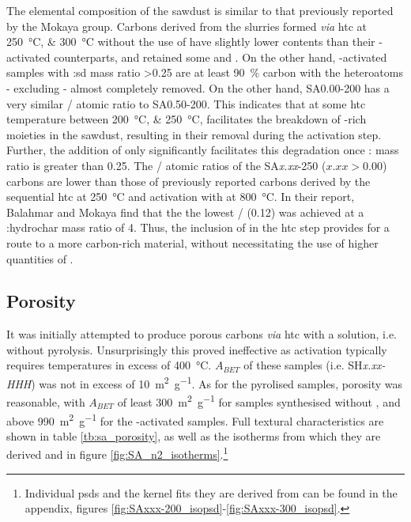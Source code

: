The elemental composition of the sawdust is similar to that previously reported by the Mokaya group.\citep{Balahmar2019Pre, Balahmar2017Biomass} Carbons derived from the slurries formed \textit{via} \gls{htc} at \qtylist[list-units=single, list-final-separator={or }]{250;300}{\degreeCelsius} without the use of  have slightly lower  contents than their -activated counterparts, and retained some  and . On the other hand, -activated samples with :\acrshort{sd} mass ratio \num{>0.25} are at least \qty{90}{\percent} carbon with the heteroatoms - excluding  - almost completely removed. On the other hand, SA0.00-200 has a very similar / atomic ratio to SA0.50-200. This indicates that at some \gls{htc} temperature between \qtylist[list-units=single]{200;250}{\degreeCelsius},  facilitates the breakdown of -rich moieties in the sawdust, resulting in their removal during the activation step. Further, the addition of  only significantly facilitates this degradation once : mass ratio is greater than 0.25. The / atomic ratios of the SA\textit{x.xx}-250 ($x.xx>0.00$) carbons are  lower than those of previously reported carbons derived by the sequential \gls{htc} at \qty{250}{\degreeCelsius} and activation with  at \qty{800}{\degreeCelsius}. In their report, Balahmar and Mokaya find that the the lowest / (\num{0.12}) was achieved at a :\gls{hydrochar} mass ratio of \num{4}.\citep{Balahmar2017Biomass} Thus, the inclusion of  in the \gls{htc} step provides for a route to a more carbon-rich material, without necessitating the use of higher quantities of .

\subsection{Porosity}

It was initially attempted to produce porous carbons \textit{via} \gls{htc} with a  solution, i.e. without \gls{pyrolysis}. Unsurprisingly this proved ineffective as \gls{activation} typically requires temperatures in excess of \qty{400}{\degreeCelsius}.\citep{Sevilla2014Energy, Blankenship2022Modulating} $A_{BET}$ of these samples (i.e. SH\textit{x.xx-HHH}) was not in excess of \qty{10}{\metre\squared\per\gram}. As for the pyrolised samples, porosity was reasonable, with $A_{BET}$ of least \qty{300}{\metre\squared\per\gram} for samples synthesised without , and above \qty{990}{\metre\squared\per\gram} for the -activated samples. Full textural characteristics are shown in table \ref{tb:sa_porosity}, as well as the isotherms from which they are derived and  in figure \ref{fig:SA_n2_isotherms}.\footnote{Individual \glspl{psd} and the kernel fits they are derived from can be found in the appendix, figures \ref{fig:SAxxx-200_isopsd}-\ref{fig:SAxxx-300_isopsd}.} 

